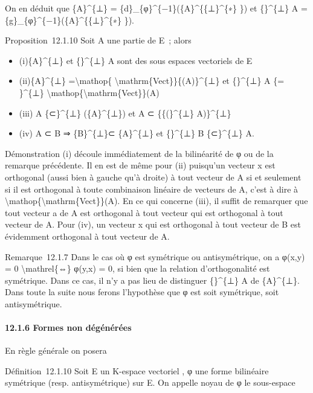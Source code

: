 \documentclass[]{article}
\begin{document}
On en déduit que \{A\}\^{}\{⊥\} =
\{d\}\_\{φ\}\^{}\{−1\}(\{A\}\^{}\{\{⊥\}\^{}\{∗\} \}) et \{\}\^{}\{⊥\} A
= \{g\}\_\{φ\}\^{}\{−1\}(\{A\}\^{}\{\{⊥\}\^{}\{∗\} \}).

Proposition~12.1.10 Soit A une partie de E~; alors

\begin{itemize}
\itemsep1pt\parskip0pt
\item
  (i)\{A\}\^{}\{⊥\} et \{\}\^{}\{⊥\} A sont des sous espaces vectoriels
  de E
\item
  (ii)\{A\}\^{}\{⊥\} =\textbackslash{}mathop\{
  \textbackslash{}mathrm\{Vect\}\}\{(A)\}\^{}\{⊥\} et \{\}\^{}\{⊥\} A
  \{= \}\^{}\{⊥\}
  \textbackslash{}mathop\{\textbackslash{}mathrm\{Vect\}\}(A)
\item
  (iii) A \{⊂\}\^{}\{⊥\} (\{A\}\^{}\{⊥\}) et A ⊂ \{\{(\}\^{}\{⊥\}
  A)\}\^{}\{⊥\}
\item
  (iv) A ⊂ B ⇒ \{B\}\^{}\{⊥\}⊂ \{A\}\^{}\{⊥\} et \{\}\^{}\{⊥\} B
  \{⊂\}\^{}\{⊥\} A.
\end{itemize}

Démonstration (i) découle immédiatement de la bilinéarité de φ ou de la
remarque précédente. Il en est de même pour (ii) puisqu'un vecteur x est
orthogonal (aussi bien à gauche qu'à droite) à tout vecteur de A si et
seulement si il est orthogonal à toute combinaison linéaire de vecteurs
de A, c'est à dire à
\textbackslash{}mathop\{\textbackslash{}mathrm\{Vect\}\}(A). En ce qui
concerne (iii), il suffit de remarquer que tout vecteur a de A est
orthogonal à tout vecteur qui est orthogonal à tout vecteur de A. Pour
(iv), un vecteur x qui est orthogonal à tout vecteur de B est évidemment
orthogonal à tout vecteur de A.

Remarque~12.1.7 Dans le cas où φ est symétrique ou antisymétrique, on a
φ(x,y) = 0 \textbackslash{}mathrel\{⇔\} φ(y,x) = 0, si bien que la
relation d'orthogonalité est symétrique. Dans ce cas, il n'y a pas lieu
de distinguer \{\}\^{}\{⊥\} A de \{A\}\^{}\{⊥\}. Dans toute la suite
nous ferons l'hypothèse que φ est soit symétrique, soit antisymétrique.

\paragraph{12.1.6 Formes non dégénérées}

En règle générale on posera

Définition~12.1.10 Soit E un K-espace vectoriel , φ une forme bilinéaire
symétrique (resp. antisymétrique) sur E. On appelle noyau de φ le
sous-espace
\end{document}
